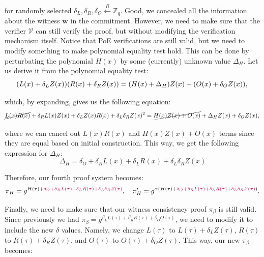 \documentclass[../lecture-notes.tex]{subfiles}
\begin{document}
for randomly selected $\delta_L, \delta_R, \delta_O \xleftarrow{R} \mathbb{Z}_q$. Good, we concealed all the information about the witness $\mathbf{w}$ in the commitment. However, we need to make sure that the verifier $\mathcal{V}$ can still verify the proof, but without modifying the verification mechanism itself. Notice that PoE verifications are still valid, but we need to modify something to make polynomial equality test hold. This can be done by perturbating the polynomial $H(x)$ by some (currently) unknown value $\Delta_H$. Let us derive it from the polynomial equality test:
\begin{equation*}
    (L(x) + \delta_L Z(x))(R(x) + \delta_R Z(x)) = (H(x) + \Delta_H)Z(x) + (O(x) + \delta_O Z(x)), \\
\end{equation*}

which, by expanding, gives us the following equation:
\begin{equation*}
    \cancel{L(x)R(x)} + \delta_R L(x)Z(x) + \delta_L Z(x)R(x) + \delta_L \delta_R Z(x)^2 = \cancel{H(x)Z(x) + O(x)} + \Delta_HZ(x) + \delta_O Z(x), \\
\end{equation*}

where we can cancel out $L(x)R(x)$ and $H(x)Z(x) + O(x)$ terms since they are equal based on initial construction. This way, we get the following expression for $\Delta_H$:
\begin{equation*}
    \Delta_H = \delta_O + \delta_R L(x) + \delta_L R(x) + \delta_L \delta_R Z(x)
\end{equation*}

Therefore, our fourth proof system becomes:
\begin{equation*}
    \pi_H = g^{H(\tau) + \textcolor{purple}{\delta_O + \delta_R L(\tau) + \delta_L R(\tau) + \delta_L \delta_R Z(\tau)}}, \quad \pi_H' = g^{\alpha(H(\tau) + \textcolor{purple}{\delta_O + \delta_R L(\tau) + \delta_L R(\tau) + \delta_L \delta_R Z(\tau)})}.
\end{equation*}

Finally, we need to make sure that our witness consistency proof $\pi_{\beta}$ is still valid. Since previously we had $\pi_{\beta} = g^{\beta_LL(\tau) + \beta_RR(\tau) + \beta_OO(\tau)}$, we need to modify it to include the new $\delta$ values. Namely, we change $L(\tau)$ to $L(\tau)+\delta_LZ(\tau)$, $R(\tau)$ to $R(\tau)+\delta_RZ(\tau)$, and $O(\tau)$ to $O(\tau)+\delta_OZ(\tau)$. This way, our new $\pi_{\beta}$ becomes:
\end{document}
